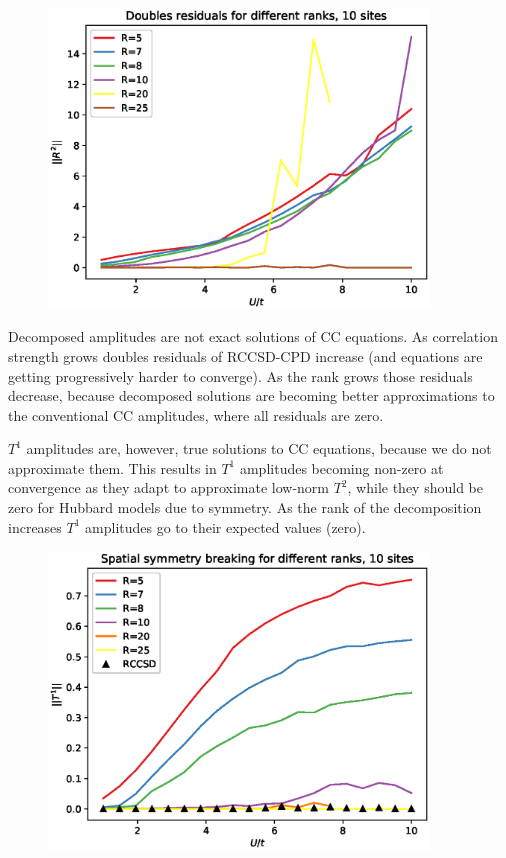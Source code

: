 \documentclass[a4paper,10pt]{article}
\begin{document}
\begin{figure}[!htb]
\centering
\includegraphics[width=0.9\textwidth]{figures/r2_norms_vs_u_10_sites.eps}
\end{figure}

Decomposed amplitudes are not exact solutions of CC equations. As correlation strength
grows doubles residuals of RCCSD-CPD increase (and equations are getting progressively harder to converge).
As the rank grows those residuals decrease, because decomposed solutions are becoming better
approximations to the conventional CC amplitudes, where all residuals are zero.

$T^{1}$ amplitudes are, however, true solutions to CC equations, because we do not approximate them. 
This results in $T^{1}$ amplitudes becoming non-zero at convergence as they adapt to approximate low-norm $T^{2}$,
while they should be zero for Hubbard models due to symmetry. As the rank of the decomposition increases
$T^{1}$ amplitudes go to their expected values (zero).

\begin{figure}[!htb]
\centering
\includegraphics[width=0.9\textwidth]{figures/t1_norms_vs_u_10_sites.eps}
\end{figure}
\end{document}
